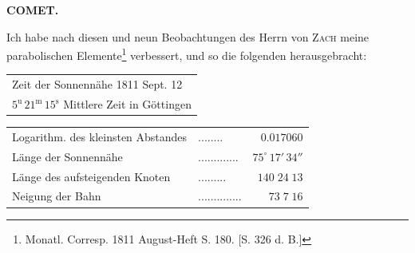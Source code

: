 \clearpage
\thispagestyle{empty}
\noindent{}%
%
\parbox[t]{\dimexpr\linewidth-24mm\relax}{\centering\footnotesize\bfseries COMET.\par}%
\makebox[12mm][r]{}\par\nobreak\medskip
\par\indent Ich habe nach diesen und neun Beobachtungen des Herrn von \textsc{Zach} meine parabolischen Elemente\footnote{Monatl. Corresp. 1811 August-Heft S. 180. [S. 326 d. B.]} verbessert, und so die folgenden herausgebracht:
\begin{center}\fontsize{10}{12}\selectfont\setlength{\tabcolsep}{4pt}\renewcommand{\arraystretch}{1.15}\begin{tabular}{l}
Zeit der Sonnennähe 1811 Sept. 12\\
\quad $5^{\mathrm u}\,21^{\mathrm m}\,15^{\mathrm s}$ Mittlere Zeit in Göttingen\\
\end{tabular}\end{center}
\begin{center}\fontsize{10}{12}\selectfont\setlength{\tabcolsep}{4pt}\renewcommand{\arraystretch}{1.15}\begin{tabular}{llr}
Logarithm. des kleinsten Abstandes & .\;.\;.\;.\;.\;.\;.\;. & $0.017060$\\
Länge der Sonnennähe & .\;.\;.\;.\;.\;.\;.\;.\;.\;.\;.\;.\;. & $75^\circ\,17'\,34''$\\
Länge des aufsteigenden Knoten & .\;.\;.\;.\;.\;.\;.\;.\;. & $140\;24\;13$\\
Neigung der Bahn & .\;.\;.\;.\;.\;.\;.\;.\;.\;.\;.\;.\;.\;. & $73\;7\;16$\\
\end{tabular}\end{center}

